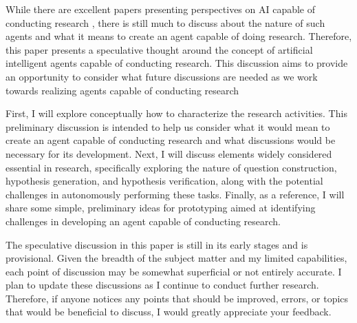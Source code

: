 While there are excellent papers presenting perspectives on AI capable of conducting research \cite{zenil2023future,coley2020autonomous,coley2020autonomousII,kitano2021nobel,wang2023scientific,zenil2023,zhang2023artificial,hope2022computational}, there is still much to discuss about the nature of such agents and what it means to create an agent capable of doing research. Therefore, this paper presents a speculative thought around the concept of artificial intelligent agents capable of conducting research. This discussion aims to provide an opportunity to consider what future discussions are needed as we work towards realizing agents capable of conducting research 

First, I will explore conceptually how to characterize the research activities. This preliminary discussion is intended to help us consider what it would mean to create an agent capable of conducting research and what discussions would be necessary for its development. Next, I will discuss elements widely considered essential in research, specifically exploring the nature of question construction, hypothesis generation, and hypothesis verification, along with the potential challenges in autonomously performing these tasks. Finally, as a reference, I will share some simple, preliminary ideas for prototyping aimed at identifying challenges in developing an agent capable of conducting research.

The speculative discussion in this paper is still in its early stages and is provisional. Given the breadth of the subject matter and my limited capabilities, each point of discussion may be somewhat superficial or not entirely accurate. I plan to update these discussions as I continue to conduct further research. Therefore, if anyone notices any points that should be improved, errors, or topics that would be beneficial to discuss, I would greatly appreciate your feedback.
